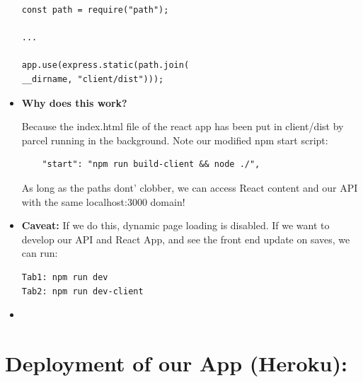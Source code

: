 \documentclass[8pt,a4paper]{extarticle}
\begin{document}
\begin{itemize}
\begin{verbatim}
const path = require("path");

...

app.use(express.static(path.join(
__dirname, "client/dist")));
\end{verbatim}
\item \textbf{Why does this work?}

Because the index.html file of the react app has been put in client/dist by parcel running in the background. Note our modified npm start script:

\begin{verbatim}
    "start": "npm run build-client && node ./",
\end{verbatim}

As long as the paths dont' clobber, we can access React content and our API with the same localhost:3000 domain!

\item \textbf{Caveat:} If we do this, dynamic page loading is disabled. If we want to develop our API and React App, and see the front end update on saves, we can run:

\begin{verbatim}
Tab1: npm run dev
Tab2: npm run dev-client
\end{verbatim}
\item
\end{itemize}

\section*{Deployment of our App (Heroku):}
\end{document}
